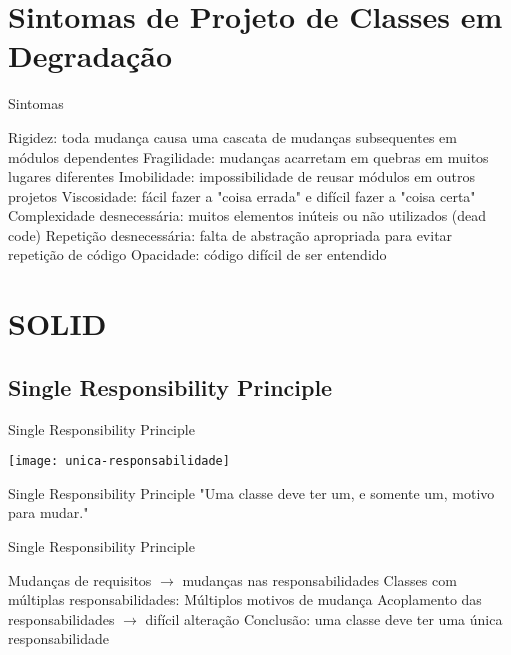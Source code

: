 \documentclass{beamer}
\begin{document}
\section{Sintomas de Projeto de Classes em Degradação}

\begin{frame}{Sintomas}
 \begin{outline}
   Rigidez: toda mudança causa uma cascata de mudanças subsequentes em módulos dependentes
   Fragilidade: mudanças acarretam em quebras em muitos lugares diferentes
   Imobilidade: impossibilidade de reusar módulos em outros projetos
   Viscosidade: fácil fazer a "coisa errada" e difícil fazer a "coisa certa"
   Complexidade desnecessária: muitos elementos inúteis ou não utilizados (dead code)
   Repetição desnecessária: falta de abstração apropriada para evitar repetição de código
   Opacidade: código difícil de ser entendido
 \end{outline}
\end{frame}


\section{SOLID}

\subsection{Single Responsibility Principle}

\begin{frame}{Single Responsibility Principle}
  \begin{center}
    \texttt{[image: unica-responsabilidade]}
  \end{center}
\end{frame}

\begin{frame}{Single Responsibility Principle}
 "Uma classe deve ter um, e somente um, motivo para mudar."
\end{frame}

\begin{frame}{Single Responsibility Principle}
 \begin{outline}
   Mudanças de requisitos $\rightarrow$ mudanças nas responsabilidades
   Classes com múltiplas responsabilidades:
     Múltiplos motivos de mudança
     Acoplamento das responsabilidades $\rightarrow$ difícil alteração
   Conclusão: uma classe deve ter uma \alert{única} responsabilidade
 \end{outline}
\end{frame}
\end{document}
